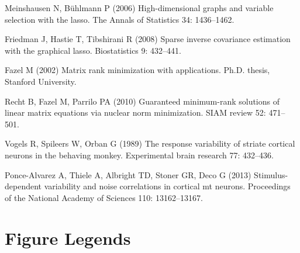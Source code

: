 \begin{thebibliography}{100}
Meinshausen N, B{\"u}hlmann P (2006) High-dimensional graphs and variable
  selection with the lasso.
\newblock The Annals of Statistics 34: 1436--1462.

Friedman J, Hastie T, Tibshirani R (2008) Sparse inverse covariance estimation
  with the graphical lasso.
\newblock Biostatistics 9: 432--441.

Fazel M (2002) Matrix rank minimization with applications.
\newblock Ph.D. thesis, Stanford University.

Recht B, Fazel M, Parrilo PA (2010) Guaranteed minimum-rank solutions of linear
  matrix equations via nuclear norm minimization.
\newblock SIAM review 52: 471--501.

Vogels R, Spileers W, Orban G (1989) The response variability of striate
  cortical neurons in the behaving monkey.
\newblock Experimental brain research 77: 432--436.

Ponce-Alvarez A, Thiele A, Albright TD, Stoner GR, Deco G (2013)
  Stimulus-dependent variability and noise correlations in cortical mt neurons.
\newblock Proceedings of the National Academy of Sciences 110: 13162--13167.

\end{thebibliography}

\newpage
\section*{Figure Legends}

